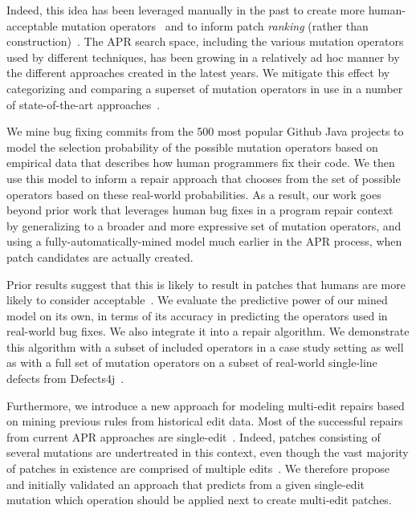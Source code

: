 \documentclass[conference]{IEEEtran}
\begin{document}
Indeed, this idea has been
leveraged manually in the past to create more human-acceptable mutation
operators~\cite{kim2013} and to inform patch \emph{ranking} (rather than construction)~\cite{xuan16,long16proph}.
The APR search space, including the various mutation
operators used by different techniques, has been growing in a relatively ad hoc 
manner by the different approaches created in the latest years. We mitigate this effect by categorizing and comparing a superset of
mutation operators in use in a number of 
state-of-the-art approaches~\cite{legoues12,Weimer13,kim2013,long16proph}.

We mine bug fixing commits from 
the 500 most popular Github Java projects to model the selection probability of
the possible mutation operators based on 
empirical data that describes how human programmers fix their code.  We then use this
model to inform a repair approach that chooses from the set of possible
operators based on these real-world
probabilities.
As a result, our work goes beyond prior work that leverages human bug
fixes in a program repair context~\cite{kim2013,xuan16,long16proph} by generalizing
to a broader and more expressive set of
mutation operators, and using a fully-automatically-mined model much 
earlier in the APR process, when
patch candidates are actually created.  

Prior results suggest that this is likely to result in patches that
humans are more likely to consider acceptable~\cite{kim2013}.
%
We evaluate the predictive power of our mined model on its own, in terms of its
accuracy in predicting the operators used in real-world bug fixes.  We also
integrate it into a repair algorithm. We demonstrate this algorithm with a
subset of included operators in 
a case study setting as well as with a full set of mutation
operators on a subset of real-world single-line defects
from Defects4j~\cite{just14}. 

Furthermore, we introduce a new approach for modeling multi-edit repairs based on
mining previous rules from historical edit data. Most of the
successful repairs from current APR approaches are
single-edit~\cite{Weimer13,Qi15,kim2013,arcuri11}.  
%
Indeed, patches
consisting of several mutations are undertreated in this context, even though the vast majority
of patches in existence are comprised of multiple edits~\cite{Soto15,zhong15}.
We therefore
 propose and initially validated an approach that predicts from a given 
single-edit mutation which operation should be applied
next to create multi-edit patches. 
\end{document}
